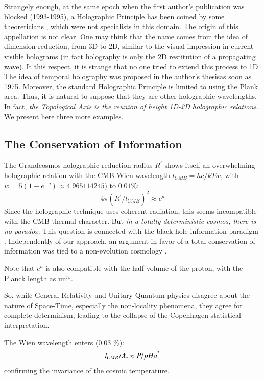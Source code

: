 \documentclass[twoside,draft]{article}
\begin{document}
\begin{sloppypar}
Strangely enough, at the same epoch when the first author's publication was blocked (1993-1995), a Holographic Principle has been coined by some theoreticians \cite{Bousso}, which were not specialists in this domain. The origin of this appellation is not clear. One may think that the name comes from the idea of dimension reduction, from 3D to 2D, similar to the visual impression in current visible holograms (in fact holography is only the 2D restitution of a propagating wave). It this respect, it is strange that no one tried to extend this process to 1D. The idea of temporal holography was proposed in the author's thesisas soon as 1975. Moreover, the standard Holographic Principle is limited to using the Plank area. Thus, it is natural to suppose that they are other holographic wavelengths. In fact, \textit{the Topological Axis is the reunion of height 1D-2D holographic relations}. We present here three more examples. 

\subsection{The Conservation of Information}

The Grandcosmos holographic reduction radius $R^{\prime}$ shows itself an overwhelming holographic
relation with the CMB Wien wavelength $l_{CMB} = hc/kTw $, with $w = 5 (1-e^{-g}) \approx 4.965114245)$ to $0.01\%$:
\begin{equation}
4\pi(R^{\prime}/l_{CMB})^{2} \approx e^{a}
\end{equation}
Since the holographic technique uses coherent radiation, this seems incompatible with the CMB
thermal character. But \textit{in a totally deterministic cosmos, there is no paradox}. This question is
connected with the black hole information paradigm \cite{Preskill}. Independently of our approach, an
argument in favor of a total conservation of information was tied to a non-evolution cosmology
\cite{Nikolic}. 

Note that $e^{a}$ is also compatible with the half volume of the proton, with
the Planck length as unit.

So, while General Relativity and Unitary Quantum physics disagree about the nature of Space-Time, especially the non-locality phenomena, they agree for complete determinism, leading to the collapse of the
Copenhagen statistical interpretation. 

The Wien wavelength enters (0.03 \%):
\begin{equation}
l_{CMB} / \lambdabar_e \approx P/pH a^3
\end{equation}
confirming the invariance of the cosmic temperature. 


\end{sloppypar}
\end{document}
